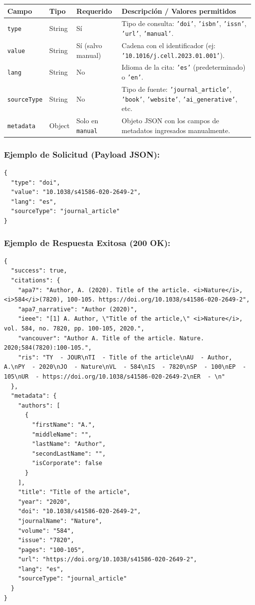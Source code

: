 \documentclass[11pt, a4paper]{article}
\begin{document}
\begin{longtable}{|p{4.0cm}|p{4.0cm}|p{4.0cm}|p{4.0cm}|}
\hline
\textbf{Campo} & \textbf{Tipo} & \textbf{Requerido} & \textbf{Descripción / Valores permitidos} \\
\hline
\endhead
\texttt{type} & String & Sí & Tipo de consulta: \texttt{'doi'}, \texttt{'isbn'}, \texttt{'issn'}, \texttt{'url'}, \texttt{'manual'}. \\
\hline
\texttt{value} & String & Sí (salvo manual) & Cadena con el identificador (ej: \texttt{'10.1016/j.cell.2023.01.001'}). \\
\hline
\texttt{lang} & String & No & Idioma de la cita: \texttt{'es'} (predeterminado) o \texttt{'en'}. \\
\hline
\texttt{sourceType} & String & No & Tipo de fuente: \texttt{'journal\_article'}, \texttt{'book'}, \texttt{'website'}, \texttt{'ai\_generative'}, etc. \\
\hline
\texttt{metadata} & Object & Solo en \texttt{manual} & Objeto JSON con los campos de metadatos ingresados manualmente. \\
\hline
\end{longtable}

\subsubsection{Ejemplo de Solicitud (Payload JSON):}

\begin{lstlisting}
{
  "type": "doi",
  "value": "10.1038/s41586-020-2649-2",
  "lang": "es",
  "sourceType": "journal_article"
}
\end{lstlisting}

\subsubsection{Ejemplo de Respuesta Exitosa (200 OK):}

\begin{lstlisting}
{
  "success": true,
  "citations": {
    "apa7": "Author, A. (2020). Title of the article. <i>Nature</i>, <i>584</i>(7820), 100-105. https://doi.org/10.1038/s41586-020-2649-2",
    "apa7_narrative": "Author (2020)",
    "ieee": "[1] A. Author, \"Title of the article,\" <i>Nature</i>, vol. 584, no. 7820, pp. 100-105, 2020.",
    "vancouver": "Author A. Title of the article. Nature. 2020;584(7820):100-105.",
    "ris": "TY  - JOUR\nTI  - Title of the article\nAU  - Author, A.\nPY  - 2020\nJO  - Nature\nVL  - 584\nIS  - 7820\nSP  - 100\nEP  - 105\nUR  - https://doi.org/10.1038/s41586-020-2649-2\nER  - \n"
  },
  "metadata": {
    "authors": [
      {
        "firstName": "A.",
        "middleName": "",
        "lastName": "Author",
        "secondLastName": "",
        "isCorporate": false
      }
    ],
    "title": "Title of the article",
    "year": "2020",
    "doi": "10.1038/s41586-020-2649-2",
    "journalName": "Nature",
    "volume": "584",
    "issue": "7820",
    "pages": "100-105",
    "url": "https://doi.org/10.1038/s41586-020-2649-2",
    "lang": "es",
    "sourceType": "journal_article"
  }
}
\end{lstlisting}
\end{document}
